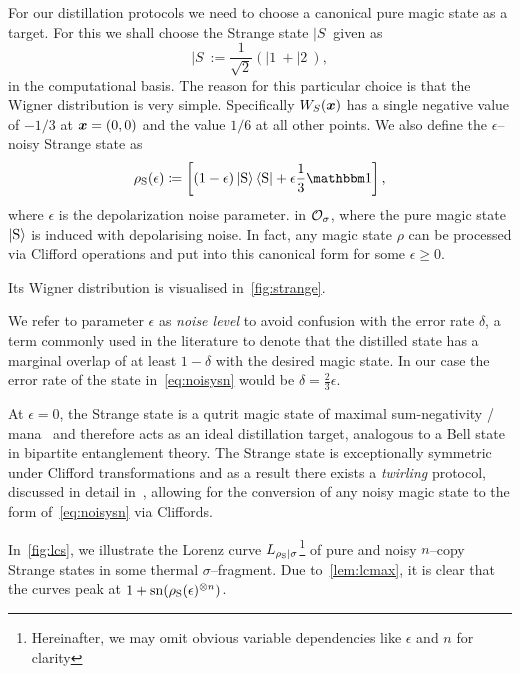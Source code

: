 \documentclass[pra,
aps,
twocolumn,
superscriptaddress,
groupedaddress,
nofootinbib,
reprint
]{revtex4-1}
\begin{document}
For our distillation protocols we need to choose a canonical pure magic state as a target. For this we shall choose the Strange state $|S\>$ given as
\begin{equation}
|S\> := \frac{1}{\sqrt{2}} (|1\> + |2\>),
\end{equation}
in the computational basis. The reason for this particular choice is that the Wigner distribution is very simple. Specifically $W_S(\boldsymbol{x})$ has a single negative value of $-1/3$ at $\boldsymbol{x} =(0,0)$ and the value $1/6$ at all other points. We also define the $\epsilon$--noisy Strange state as
\begin{equation}\label{eq:noisysn}
    \rho_{\rm{S}}(\epsilon)\coloneqq \left[ (1 - \epsilon) \ket{\rm{S}}\bra{\rm{S}} + \epsilon \frac{1}{3}\id \right],
\end{equation}
where $\epsilon$ is the depolarization noise parameter. in $\mathcal{O}_\sigma$, where the pure magic state $\ket{\rm{S}}$ is induced with depolarising noise. In fact, any magic state $\rho$ can be processed via Clifford operations and put into this canonical form for some $\epsilon \ge 0$.


Its Wigner distribution is visualised in~\cref{fig:strange}.

We refer to parameter $\epsilon$ as \emph{noise level} to avoid confusion with the error rate $\delta$, a term commonly used in the literature to denote that the distilled state has a marginal overlap of at least $1-\delta$ with the desired magic state.
In our case the error rate of the state in~\cref{eq:noisysn} would be $\delta = \frac{2}{3}\epsilon$.

At $\epsilon=0$, the Strange state is a qutrit magic state of maximal sum-negativity / mana~\cite{cit:veitch2} and therefore acts as an ideal distillation target, analogous to a Bell state in bipartite entanglement theory.
The Strange state is exceptionally symmetric under Clifford transformations and as a result there exists a \emph{twirling} protocol, discussed in detail in~\cite{cit:prakash,cit:prakash2}, allowing for the conversion of any noisy magic state to the form of~\cref{eq:noisysn} via Cliffords.

In~\cref{fig:lcs}, we illustrate the Lorenz curve ${L_{\rho_{\rm{S}}|\sigma}}$\footnote{Hereinafter, we may omit obvious variable dependencies like $\epsilon$ and $n$ for clarity} of pure and noisy $n$--copy Strange states in some thermal $\sigma$--fragment.
Due to~\cref{lem:lcmax}, it is clear that the curves peak at $1 + {{\rm{sn}}(\rho_{\rm{S}}(\epsilon)^{\otimes n})}$.
\end{document}
